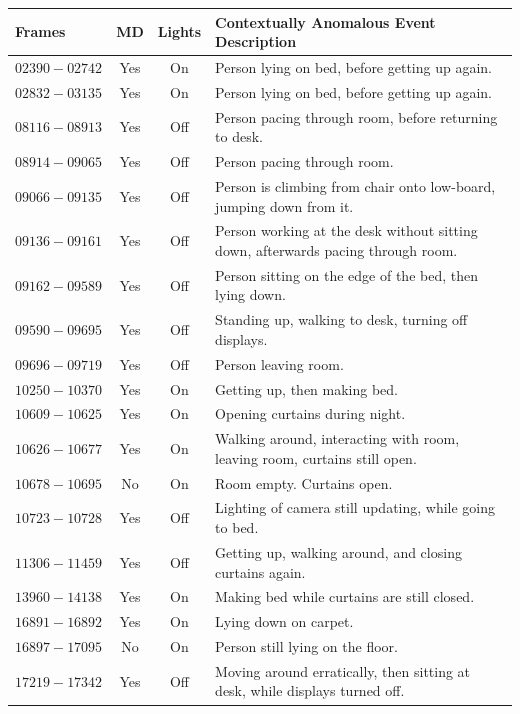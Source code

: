 \begin{table}
	\centering
	\begin{tabular}{ | l | c | c | p{9.5cm} |}
	\toprule
	\textbf{Frames} & \textbf{MD} & \textbf{Lights} & \textbf{Contextually Anomalous Event Description} \\
	\midrule
	$02390 - 02742$ & Yes & On  & Person lying on bed, before getting up again. \\
	$02832 - 03135$ & Yes & On  & Person lying on bed, before getting up again. \\
	$08116 - 08913$ & Yes & Off & Person pacing through room, before returning to desk. \\
	$08914 - 09065$ & Yes & Off & Person pacing through room. \\
	$09066 - 09135$ & Yes & Off & Person is climbing from chair onto low-board, jumping down from it. \\
	$09136 - 09161$ & Yes & Off & Person working at the desk without sitting down, afterwards pacing through room. \\
	$09162 - 09589$ & Yes & Off & Person sitting on the edge of the bed, then lying down. \\
	$09590 - 09695$ & Yes & Off & Standing up, walking to desk, turning off displays. \\
	$09696 - 09719$ & Yes & Off & Person leaving room. \\
	$10250 - 10370$ & Yes & On  & Getting up, then making bed. \\
	$10609 - 10625$ & Yes & On  & Opening curtains during night. \\
	$10626 - 10677$ & Yes & On  & Walking around, interacting with room, leaving room, curtains still open. \\
	$10678 - 10695$ & No  & On  & Room empty. Curtains open. \\
	$10723 - 10728$ & Yes & Off & Lighting of camera still updating, while going to bed. \\
	$11306 - 11459$ & Yes & Off & Getting up, walking around, and closing curtains again. \\
	$13960 - 14138$ & Yes & On  & Making bed while curtains are still closed. \\
	$16891 - 16892$ & Yes & On  & Lying down on carpet. \\
	$16897 - 17095$ & No  & On  & Person still lying on the floor. \\
	$17219 - 17342$ & Yes & Off & Moving around erratically, then sitting at desk, while displays turned off. \\

\end{tabular}
\end{table}
